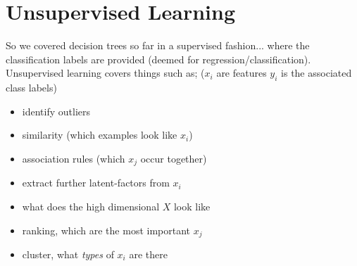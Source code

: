 \documentclass{article}
\begin{document}
\section*{Unsupervised Learning}
So we covered decision trees so far in a supervised fashion... where the classification labels are provided (deemed for regression/classification). Unsupervised learning covers things such as; ($x_i$ are features $y_i$ is the associated class labels)

\begin{itemize}
	\item identify outliers
	\item similarity (which examples look like $x_i$)
	\item association rules (which $x_j$ occur together)
	\item extract further latent-factors from $x_i$
	\item what does the high dimensional $X$ look like
	\item ranking, which are the most important $x_j$
	\item cluster, what {\em types} of $x_i$ are there
\end{itemize}
\end{document}
